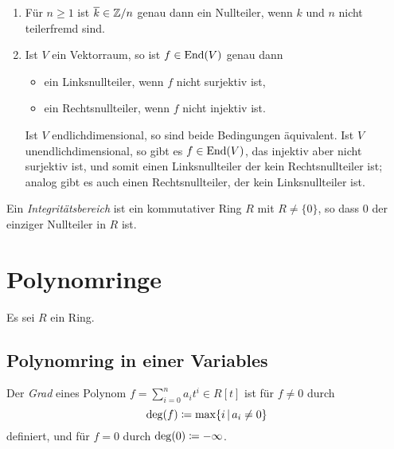 \begin{example}
  \begin{enumerate}
    \item
      Für $n \geq 1$ ist $\overline{k} \in \mathbb{Z}/n$ genau dann ein Nullteiler, wenn $k$ und $n$ nicht teilerfremd sind.
    \item
      Ist $V$ ein Vektorraum, so ist $f \in \operatorname{End}(V)$ genau dann
      \begin{itemize}
        \item
          ein Linksnullteiler, wenn $f$ nicht surjektiv ist,
        \item
          ein Rechtsnullteiler, wenn $f$ nicht injektiv ist.
      \end{itemize}
      Ist $V$ endlichdimensional, so sind beide Bedingungen äquivalent.
      Ist $V$ unendlichdimensional, so gibt es $f \in \operatorname{End}(V)$, das injektiv aber nicht surjektiv ist, und somit einen Linksnullteiler der kein Rechtsnullteiler ist;
      analog gibt es auch einen Rechtsnullteiler, der kein Linksnullteiler ist.
  \end{enumerate}
\end{example}


\begin{definition}
  Ein \emph{Integritätsbereich} ist ein kommutativer Ring $R$ mit $R \neq \{0\}$, so dass $0$ der einziger Nullteiler in $R$ ist.
\end{definition}





\section{Polynomringe}

Es sei $R$ ein Ring.



\subsection{Polynomring in einer Variables}

\begin{definition}
  Der \emph{Grad} eines Polynom $f = \sum_{i=0}^n a_i t^i \in R[t]$ ist für $f \neq 0$ durch
  \[
              \deg(f)
    \defined  \max \{i \suchthat a_i \neq 0\}
  \]
  definiert, und für $f = 0$ durch $\deg(0) \coloneqq -\infty$.
\end{definition}


